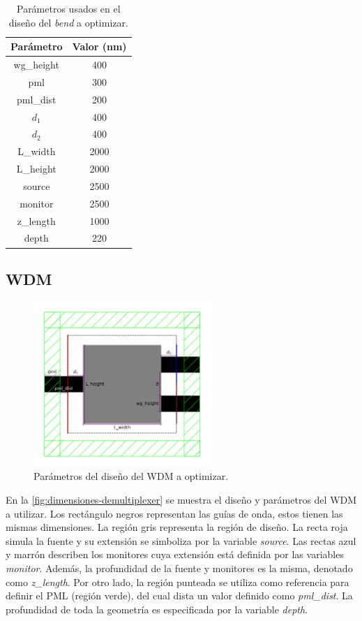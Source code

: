 \begin{table}[ht]
    \centering
    \begin{tabular}{|c|c|}
    \hline 
    Parámetro &  Valor (nm) \\
    \hline 
    wg\_height & 400 \\
    pml & 300 \\
    pml\_dist & 200 \\
    $d_1$ & 400 \\
    $d_2$ & 400 \\
    L\_width & 2000 \\
    L\_height & 2000 \\
    source & 2500 \\
    monitor & 2500 \\
    z\_length & 1000 \\
    depth & 220 \\
    \hline 
    \end{tabular}
    \caption{Parámetros usados en el diseño del \emph{bend} a optimizar.}
    \label{tab:bend-values}
\end{table}

\subsection{WDM}

\begin{figure}[ht]
  \centering
  \includegraphics[width=0.6\textwidth]{image/proposal/wdm.png}
  \caption{Parámetros del diseño del WDM a optimizar.}
  \label{fig:dimensiones-demultiplexer}
\end{figure}

En la \autoref{fig:dimensiones-demultiplexer} se muestra el diseño y parámetros del WDM a utilizar.
Los rectángulo negros representan las guías de onda, estos tienen las mismas dimensiones.
La región gris representa la región de diseño.
La recta roja simula la fuente y su extensión se simboliza por la variable \emph{source}.
Las rectas azul y marrón describen los monitores cuya extensión está definida por las variables \emph{monitor}.
Además, la profundidad de la fuente y monitores es la misma, denotado como \emph{z\_length}.
Por otro lado, la región punteada se utiliza como referencia para definir el PML (región verde),
del cual dista un valor definido como \emph{pml\_dist}.
La profundidad de toda la geometría es especificada por la variable \emph{depth}.

